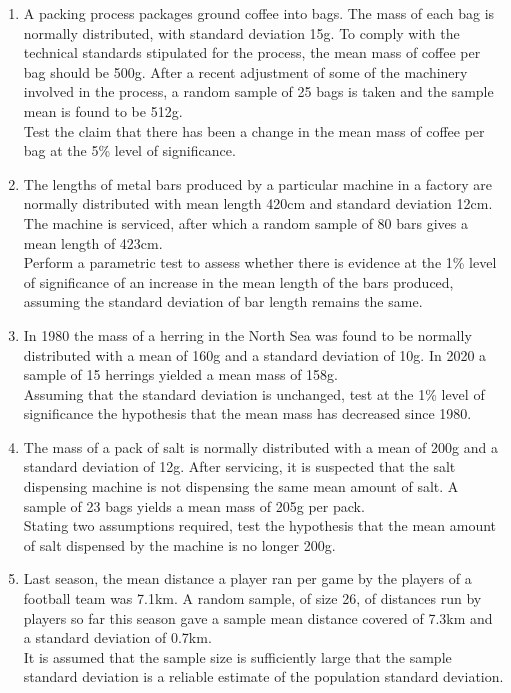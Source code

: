 \documentclass[
  11pt,
]{book}
\begin{document}
\begin{enumerate}
    \item A packing process packages ground coffee into bags. The mass of each bag is normally distributed, with standard deviation 15g. To comply with the technical standards stipulated for the process, the mean mass of coffee per bag should be 500g. After a recent adjustment of some of the machinery involved in the process, a random sample of 25 bags is taken and the sample mean is found to be 512g.\\[0.5em] Test the claim that there has been a change in the mean mass of coffee per bag at the 5\% level of significance.
    \item The lengths of metal bars produced by a particular machine in a factory are normally distributed with mean length 420cm and standard deviation 12cm. The machine is serviced, after which a random sample of 80 bars gives a mean length of 423cm.\\[0.5em] Perform a parametric test to assess whether there is evidence at the 1\% level of significance of an increase in the mean length of the bars produced, assuming the standard deviation of bar length remains the same.
    \item In 1980 the mass of a herring in the North Sea was found to be normally distributed with a mean of 160g and a standard deviation of 10g. In 2020 a sample of 15 herrings yielded a mean mass of 158g.\\[0.5em] Assuming that the standard deviation is unchanged, test at the 1\% level of significance the hypothesis that the mean mass has decreased since 1980.
    \item The mass of a pack of salt is normally distributed with a mean of 200g and a standard deviation of 12g. After servicing, it is suspected that the salt dispensing machine is not dispensing the same mean amount of salt. A sample of 23 bags yields a mean mass of 205g per pack.\\[0.5em] Stating two assumptions required, test the hypothesis that the mean amount of salt dispensed by the machine is no longer 200g.
    \item Last season, the mean distance a player ran per game by the players of a football team was 7.1km. A random sample, of size 26, of distances run by players so far this season gave a sample mean distance covered of 7.3km and a standard deviation of 0.7km.\\[0.6em] It is assumed that the sample size is sufficiently large that the sample standard deviation is a reliable estimate of the population standard deviation.

\end{enumerate}
\end{document}
